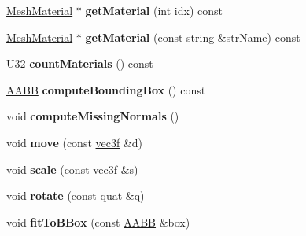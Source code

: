 \begin{DoxyCompactItemize}
\item 
\hypertarget{classps_1_1scene_1_1Mesh_a3a5836d198af9ba40ecce0c3cd06dcf8}{}\hyperlink{classps_1_1scene_1_1MeshMaterial}{Mesh\+Material} $\ast$ {\bfseries get\+Material} (int idx) const \label{classps_1_1scene_1_1Mesh_a3a5836d198af9ba40ecce0c3cd06dcf8}

\item 
\hypertarget{classps_1_1scene_1_1Mesh_a8bd41c6aabd0e6531ba339010604a6ae}{}\hyperlink{classps_1_1scene_1_1MeshMaterial}{Mesh\+Material} $\ast$ {\bfseries get\+Material} (const string \&str\+Name) const \label{classps_1_1scene_1_1Mesh_a8bd41c6aabd0e6531ba339010604a6ae}

\item 
\hypertarget{classps_1_1scene_1_1Mesh_a0748028365d38a4d568f9d303ec1b611}{}U32 {\bfseries count\+Materials} () const \label{classps_1_1scene_1_1Mesh_a0748028365d38a4d568f9d303ec1b611}

\item 
\hypertarget{classps_1_1scene_1_1Mesh_a7a288493f2f3acedeeaa1397a5b65699}{}\hyperlink{classps_1_1base_1_1AABB}{A\+A\+B\+B} {\bfseries compute\+Bounding\+Box} () const \label{classps_1_1scene_1_1Mesh_a7a288493f2f3acedeeaa1397a5b65699}

\item 
\hypertarget{classps_1_1scene_1_1Mesh_af0140faaabe04e1f5692012b79444826}{}void {\bfseries compute\+Missing\+Normals} ()\label{classps_1_1scene_1_1Mesh_af0140faaabe04e1f5692012b79444826}

\item 
\hypertarget{classps_1_1scene_1_1Mesh_afd0ddc2e64ded35b9d368016b9ccdbd8}{}void {\bfseries move} (const \hyperlink{classps_1_1base_1_1Vec3}{vec3f} \&d)\label{classps_1_1scene_1_1Mesh_afd0ddc2e64ded35b9d368016b9ccdbd8}

\item 
\hypertarget{classps_1_1scene_1_1Mesh_a4ae686c746bd2897fcf201d7865b3935}{}void {\bfseries scale} (const \hyperlink{classps_1_1base_1_1Vec3}{vec3f} \&s)\label{classps_1_1scene_1_1Mesh_a4ae686c746bd2897fcf201d7865b3935}

\item 
\hypertarget{classps_1_1scene_1_1Mesh_a2c8a6bd2de6f9addcbe6e9dcf21d5abe}{}void {\bfseries rotate} (const \hyperlink{classps_1_1base_1_1Quaternion}{quat} \&q)\label{classps_1_1scene_1_1Mesh_a2c8a6bd2de6f9addcbe6e9dcf21d5abe}

\item 
\hypertarget{classps_1_1scene_1_1Mesh_ab7a98aaafffd3fd27d209150b2375aee}{}void {\bfseries fit\+To\+B\+Box} (const \hyperlink{classps_1_1base_1_1AABB}{A\+A\+B\+B} \&box)\label{classps_1_1scene_1_1Mesh_ab7a98aaafffd3fd27d209150b2375aee}

\end{DoxyCompactItemize}
